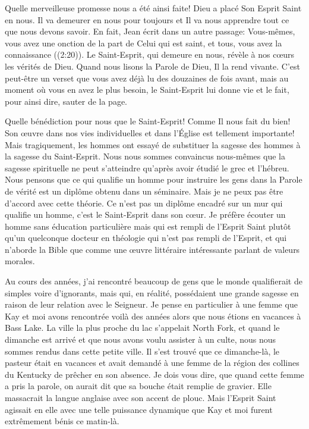 Quelle merveilleuse promesse nous a été ainsi faite! Dieu a placé Son Esprit
 Saint en nous. Il va demeurer en nous pour toujours \ocadr et Il va nous
 apprendre tout ce que nous devons savoir. En fait, Jean écrit dans un autre
 passage:
 \Og Vous-mêmes, vous avez une onction de la part de Celui qui est saint,
 et tous, vous avez la connaissance \Fg{} ((2:20)).
 Le Saint-Esprit, qui demeure en nous, révèle à nos c\oe{}urs les vérités de Dieu.
 Quand nous lisons la Parole de Dieu, Il la rend vivante.
 C'est peut-être un verset que vous avez déjà lu des douzaines de fois avant,
 mais au moment où vous en avez le plus besoin, le Saint-Esprit lui donne vie
 et le fait, pour ainsi dire, sauter de la page.

Quelle bénédiction pour nous que le Saint-Esprit!
 Comme Il nous fait du bien! Son \oe{}uvre dans nos vies individuelles et dans
 l'Église est tellement importante! Mais tragiquement, les hommes ont essayé de
 substituer la sagesse des hommes à la sagesse du Saint-Esprit.
 Nous nous sommes convaincus nous-mêmes que la sagesse spirituelle ne peut
 s'atteindre qu'après avoir étudié le grec et l'hébreu. Nous pensons que ce qui
 qualifie un homme pour instruire les gens dans la Parole de vérité est
 un diplôme obtenu dans un séminaire.
 Mais je ne peux pas être d'accord avec cette théorie.
 Ce n'est pas un diplôme encadré sur un mur qui qualifie un homme,
 c'est le Saint-Esprit dans son c\oe{}ur.
 Je préfère écouter un homme sans éducation particulière mais
 qui est rempli de l'Esprit Saint plutôt qu'un quelconque docteur
 en théologie qui n'est pas rempli de l'Esprit,
 et qui n'aborde la Bible que comme une \oe{}uvre littéraire intéressante
 parlant de valeurs morales.

Au cours des années, j'ai rencontré beaucoup de gens que le monde
 qualifierait de simples voire d'ignorants, mais qui, en réalité,
 possédaient une grande sagesse en raison de leur relation avec le Seigneur.
 Je pense en particulier à une femme que Kay et moi avons rencontrée
 voilà des années alors que nous étions en vacances à Bass Lake.
 La ville la plus proche du lac s'appelait North Fork, et quand le dimanche
 est arrivé et que nous avons voulu assister à un culte,
 nous nous sommes rendus dans cette petite ville. Il s'est trouvé que ce
 dimanche-là, le pasteur était en vacances et avait demandé
 à une femme de la région des collines du Kentucky de 
 prêcher en son absence.
 Je dois vous dire, que quand cette femme a pris la parole, on aurait dit
 que sa bouche était remplie de gravier. Elle massacrait la langue anglaise
 avec son accent de plouc.
 Mais l'Esprit Saint agissait en elle avec une telle puissance dynamique
 que Kay et moi furent extrêmement bénis ce matin-là.

